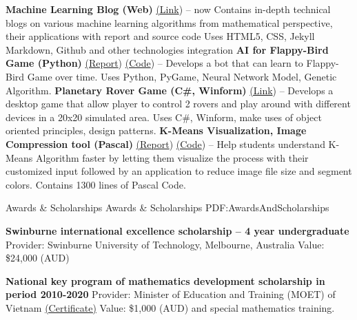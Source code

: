 \documentclass[letterpaper,MMMyyyy,nonstopmode]{simpleresumecv}
\begin{document}
\begin{Body}
\BulletItem
\textbf{Machine Learning Blog (Web)} \href{https://dunglai.github.io}{(\color{blue}Link})
\hfill
{} --
now
\SubBulletItem Contains in-depth technical blogs on various machine learning algorithms from mathematical perspective, their applications with report and source code
\SubBulletItem Uses HTML5, CSS, Jekyll Markdown, Github and other technologies integration
\Gap\Gap\Gap
\BulletItem
\textbf{AI for Flappy-Bird Game (Python)} \href{https://dunglai.github.io/public/post_img/FlappyBirdAI/report.pdf}{(\color{blue}Report}) \href{https://github.com/DungLai/AI-FlappyBird}{(\color{blue}Code})
\hfill
{} --
\SubBulletItem Develops a bot that can learn to Flappy-Bird Game over time.
\SubBulletItem Uses Python, PyGame, Neural Network Model, Genetic Algorithm.
\Gap\Gap\Gap
\BulletItem
\textbf{Planetary Rover Game (C\#, Winform)} \href{https://dunglai.github.io/2017/05/27/Planetary-Rover/}{(\color{blue}Link})
\hfill
{} --
\SubBulletItem Develops a desktop game that allow player to control 2 rovers and play around with different devices in a 20x20 simulated area.
\SubBulletItem Uses C\#, Winform, make uses of object oriented principles, design patterns.
\Gap\Gap\Gap
\BulletItem
\textbf{K-Means Visualization, Image Compression tool (Pascal)} \href{https://dunglai.github.io/public/post_img/Kmeans/Report.pdf}{(\color{blue}Report}) \href{https://github.com/DungLai/Image-Compression-Segmentation}{(\color{blue}Code})
\hfill
{} --
\SubBulletItem Help students understand K-Means Algorithm faster by letting them visualize the process with their customized input followed by an application to reduce image file size and segment colors.
\SubBulletItem Contains 1300 lines of Pascal Code.



\Section
{Awards \&\newline
Scholarships}
{Awards \& Scholarships}
{PDF:AwardsAndScholarships}

\BulletItem
\textbf{Swinburne international excellence scholarship – 4 year undergraduate}
\hfill
{}
\SubBulletItem Provider: Swinburne University of Technology, Melbourne, Australia
\SubBulletItem Value: \$24,000 (AUD)

\Gap\Gap\Gap
\BulletItem
\textbf{National key program of mathematics development scholarship in period 2010-2020}
\hfill
{}
\SubBulletItem Provider: Minister of Education and Training (MOET) of Vietnam \href{}{(\color{blue}Certificate)}
\SubBulletItem Value: \$1,000 (AUD) and special mathematics training.



\end{Body}
\end{document}
